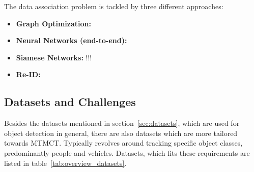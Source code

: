 The data association problem is tackled by three different approaches:

\begin{itemize}
    \item \textbf{Graph Optimization:} \cite{Zhang08}
    \item \textbf{Neural Networks (end-to-end):} \cite{Ristani18}
    \item \textbf{Siamese Networks:} !!!
    \item \textbf{Re-ID:} \cite{Zheng15}
\end{itemize}

\subsection{Datasets and Challenges}\label{subsec:datasets_and_challenges}
Besides the datasets mentioned in section~\ref{sec:datasets}, which are used for object detection in general, there are also datasets which are more tailored towards MTMCT. Typically revolves around tracking specific object classes, predominantly people and vehicles. Datasets, which fits these requirements are listed in table~\ref{tab:overview_datasets}.

